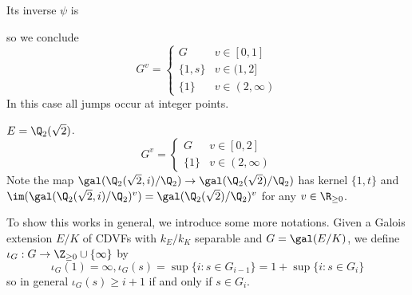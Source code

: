 \documentclass[a4paper]{article}
\begin{document}
\begin{eg}
\begin{center}
  \end{center}
  Its inverse \(\psi\) is
   \begin{center}
  \end{center}
  so we conclude
  \[
    G^v =
    \begin{cases}
      G & v \in [0, 1] \\
      \{1, s\} & v \in (1, 2] \\
      \{1\} & v \in (2, \infty)
    \end{cases}
  \]
  In this case all jumps occur at integer points.
\end{eg}

\begin{eg}
  \(E = \Q_2(\sqrt 2)\).
  \[
    G^v =
    \begin{cases}
      G & v \in [0, 2] \\
      \{1\} & v \in (2, \infty)
    \end{cases}
  \]
  Note the map \(\gal(\Q_2(\sqrt 2, i)/\Q_2) \to \gal(\Q_2(\sqrt 2)/\Q_2)\) has kernel \(\{1, t\}\) and \(\im(\gal(\Q_2(\sqrt 2, i)/\Q_2)^v) = \gal(\Q_2(\sqrt 2)/\Q_2)^v\) for any \(v \in \R_{\geq 0}\).
\end{eg}

To show this works in general, we introduce some more notations. Given a Galois extension \(E/K\) of CDVFs with \(k_E/k_K\) separable and \(G = \gal(E/K)\), we define \(\iota_G: G \to \Z_{\geq 0} \cup \{\infty\}\) by
\[
  \iota_G(1) = \infty, \iota_G(s) = \sup \{i: s \in G_{i - 1}\} = 1 + \sup \{i: s \in G_i\}
\]
so in general \(\iota_G(s) \geq i + 1\) if and only if \(s \in G_i\).
\end{document}
